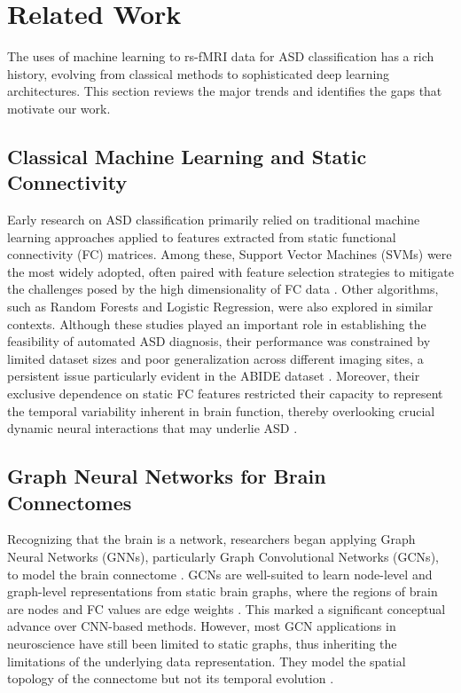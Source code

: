 \documentclass[10pt]{article}
\begin{document}
\section{Related Work}
The uses of machine learning to rs-fMRI data for ASD classification has a rich history, evolving from classical methods to sophisticated deep learning architectures. This section reviews the major trends and identifies the gaps that motivate our work.

\subsection{Classical Machine Learning and Static Connectivity}
Early research on ASD classification primarily relied on traditional machine learning approaches applied to features extracted from static functional connectivity (FC) matrices. Among these, Support Vector Machines (SVMs) were the most widely adopted, often paired with feature selection strategies to mitigate the challenges posed by the high dimensionality of FC data \parencite{nielsen2013multi, heinsfeld2018identification}. Other algorithms, such as Random Forests and Logistic Regression, were also explored in similar contexts. Although these studies played an important role in establishing the feasibility of automated ASD diagnosis, their performance was constrained by limited dataset sizes and poor generalization across different imaging sites, a persistent issue particularly evident in the ABIDE dataset \parencite{di2014autism}. Moreover, their exclusive dependence on static FC features restricted their capacity to represent the temporal variability inherent in brain function, thereby overlooking crucial dynamic neural interactions that may underlie ASD \parencite{yahata2016prediction, khosla2019detecting}.

\subsection{Graph Neural Networks for Brain Connectomes}
Recognizing that the brain is a network, researchers began applying Graph Neural Networks (GNNs), particularly Graph Convolutional Networks (GCNs), to model the brain connectome \parencite{kips2017semi}. GCNs are well-suited to learn node-level and graph-level representations from static brain graphs, where the regions of brain are nodes and FC values are edge weights \parencite{parisot2018disease}. This marked a significant conceptual advance over CNN-based methods. However, most GCN applications in neuroscience have still been limited to static graphs, thus inheriting the limitations of the underlying data representation. They model the spatial topology of the connectome but not its temporal evolution \parencite{allen2014tracking, gadgil2020spatio}.
\end{document}
